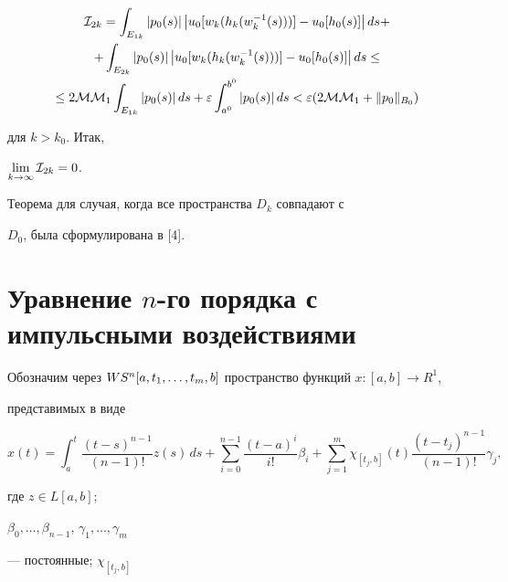\begin{pf}
\begin{multline*}
{\cal I}_{2k} =


\int_{E_{1k}} |p_0(s)|\,\big |u_0[w_k(h_k(w_k^{-1}(s)))] -


u_0[h_0(s)]\big|\,ds +\\


%


+\int_{E_{2k}} |p_0(s)|\,\big |u_0[w_k(h_k(w_k^{-1}(s)))] -


u_0[h_0(s)]\big|\,ds \leq \\


%


\leq 2{\cal M}{\cal M}_1 \int_{E_{1k}} |p_0(s)|\,ds +


\varepsilon \int_{a^0}^{b^0}


|p_0(s)|\,ds < \varepsilon (2{\cal M}{\cal M}_1 + \|p_0\|_{B_0})


\end{multline*}


для $k>k_0$. Итак,


$\lim\limits_{k\to\infty} {\cal I}_{2k} =0$.


\end{pf}





Теорема для случая, когда все пространства $D_k$ совпадают с


$D_0$, была сформулирована в [4].





\section{Уравнение $n$-го порядка с импульсными воздействиями}





Обозначим через $WS^n[a,t_1,\dotsc,t_m,b]$ пространство функций $x:[a,b]\to R^1$,


представимых в виде


$$


x(t) = \int_a^t \frac{(t-s)^{n-1}}{(n-1)!} z(s)\,ds + \sum_{i=0}^{n-1}


\frac{(t-a)^i}{i!} \beta_i +


\sum_{j=1}^m \chi_{[t_j,b]}(t) \frac{(t-t_j)^{n-1}}{(n-1)!} \gamma_j,


$$


где $z\in L[a,b]$;


$\beta_0,\dotsc,\beta_{n-1}$, $\gamma_1,\dotsc,\gamma_m$


--- постоянные; $\chi_{[t_j,b]}$


